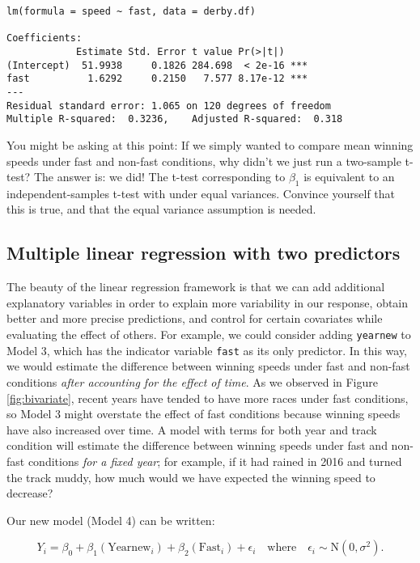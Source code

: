\documentclass[
]{krantz}
\begin{document}
\begin{verbatim}
lm(formula = speed ~ fast, data = derby.df)

Coefficients:
            Estimate Std. Error t value Pr(>|t|)    
(Intercept)  51.9938     0.1826 284.698  < 2e-16 ***
fast          1.6292     0.2150   7.577 8.17e-12 ***
---
Residual standard error: 1.065 on 120 degrees of freedom
Multiple R-squared:  0.3236,    Adjusted R-squared:  0.318 
\end{verbatim}

You might be asking at this point: If we simply wanted to compare mean winning speeds under fast and non-fast conditions, why didn't we just run a two-sample t-test? The answer is: we did! The t-test corresponding to \(\beta_{1}\) is equivalent to an independent-samples t-test with under equal variances. Convince yourself that this is true, and that the equal variance assumption is needed.

\hypertarget{multiple-linear-regression-with-two-predictors}{%
\subsection{Multiple linear regression with two predictors}\label{multiple-linear-regression-with-two-predictors}}

The beauty of the linear regression framework is that we can add additional explanatory variables in order to explain more variability in our response, obtain better and more precise predictions, and control for certain covariates while evaluating the effect of others. For example, we could consider adding \texttt{yearnew} to Model 3, which has the indicator variable \texttt{fast} as its only predictor. In this way, we would estimate the difference between winning speeds under fast and non-fast conditions \emph{after accounting for the effect of time}. As we observed in Figure \ref{fig:bivariate}, recent years have tended to have more races under fast conditions, so Model 3 might overstate the effect of fast conditions because winning speeds have also increased over time. A model with terms for both year and track condition will estimate the difference between winning speeds under fast and non-fast conditions \emph{for a fixed year}; for example, if it had rained in 2016 and turned the track muddy, how much would we have expected the winning speed to decrease?

Our new model (Model 4) can be written:

\begin{equation}
Y_{i}=\beta_{0}+\beta_{1}(\textrm{Yearnew}_{i})+\beta_{2}(\textrm{Fast}_{i})+\epsilon_{i}\quad \textrm{where}\quad \epsilon_{i}\sim \textrm{N}(0,\sigma^2).
\label{eq:model4}
\end{equation}
\end{document}
